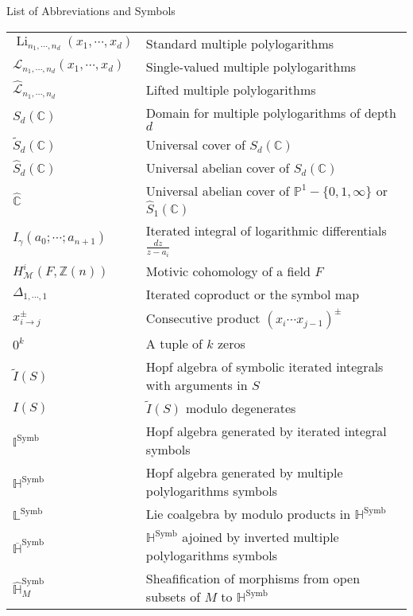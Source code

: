 \documentclass[12pt]{thesis}
\theoremstyle{definition}
\DeclareMathOperator{\Li}{Li}
\DeclareMathOperator{\Symb}{Symb}
\numberwithin{equation}{section}
\numberwithin{figure}{section}
\begin{document}
\begin{center}
\large{List of Abbreviations and Symbols} %

\vspace{1cm}

\small

\begin{tabular}{ m{4cm}  m{11cm} } 
$\Li_{n_1,\cdots,n_d}(x_1,\cdots,x_d)$ & Standard multiple polylogarithms \\
$\mathcal L_{n_1,\cdots,n_d}(x_1,\cdots,x_d)$ & Single-valued multiple polylogarithms \\
$\widehat{\mathcal L}_{n_1,\cdots,n_d}$ & Lifted multiple polylogarithms \\
$S_d(\mathbb C)$ & Domain for multiple polylogarithms of depth $d$ \\
$\widetilde S_d(\mathbb C)$ & Universal cover of $S_d(\mathbb C)$ \\
$\widehat S_d(\mathbb C)$ & Universal abelian cover of $S_d(\mathbb C)$ \\
$\widehat{\mathbb C}$ & Universal abelian cover of $\mathbb P^1-\{0,1,\infty\}$ or $\widehat S_1(\mathbb C)$ \\
$I_\gamma(a_0;\cdots;a_{n+1})$ & Iterated integral of logarithmic differentials $\frac{dz}{z-a_i}$ \\
$H^i_{\mathcal M}(F,\mathbb Z(n))$ & Motivic cohomology of a field $F$ \\
$\Delta_{1,\cdots,1}$ & Iterated coproduct or the symbol map \\
\hline
$x_{i\to j}^{\pm}$ & Consecutive product $(x_i\cdots x_{j-1})^{\pm}$ \\
$0^k$ & A tuple of $k$ zeros \\
$\widetilde I(S)$ & Hopf algebra of symbolic iterated integrals with arguments in $S$ \\
$I(S)$ & $\widetilde I(S)$ modulo degenerates \\
$\mathbb I^{\Symb}$ & Hopf algebra generated by iterated integral symbols \\
$\mathbb H^{\Symb}$ & Hopf algebra generated by multiple polylogarithms symbols \\
$\mathbb L^{\Symb}$ & Lie coalgebra by modulo products in $\mathbb H^{\Symb}$ \\
$\overline{\mathbb H}^{\Symb}$ & $\mathbb H^{\Symb}$ ajoined by inverted multiple polylogarithms symbols \\
$\widehat {\mathbb H}^{\Symb}_{M}$ & Sheafification of morphisms from open subsets of $M$ to $\mathbb H^{\Symb}$ \\

\end{tabular}
\end{center}
\end{document}
